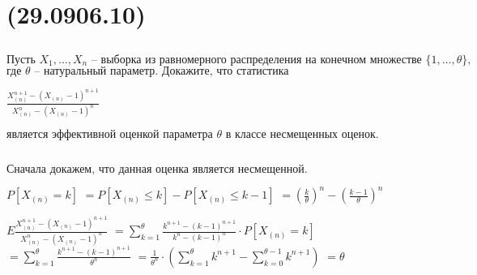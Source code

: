 \documentclass[13pt,a4paper]{scrartcl}
\def\suml{\sum\limits}
\def\prodl{\prod\limits}
\begin{document}
\def\th{\theta}
\def\prodl{\prod\limits}
\def\dd#1#2{\frac{\partial{#1}}{\partial{#2}}}
\def\maxl{\max\limits}

\section*{\allowbreak {}\allowbreak (29.09\text{ -- }06.10)}

\subsection*{\allowbreak }

\def\Xn{X_{(n)}}

\(\text{Пусть }\allowbreak X_1,..., X_n\text{ -- }\text{выборка }\allowbreak \text{из }\allowbreak \text{равномерного }\allowbreak \text{распределения }\allowbreak \text{на }\allowbreak \text{конечном }\allowbreak \text{множестве }\allowbreak \{ 1,..., \th \},\)
\(\text{где }\allowbreak \th\text{ -- }\text{натуральный }\allowbreak \text{параметр. }\allowbreak \text{Докажите, }\allowbreak \text{что }\allowbreak \text{статистика}\allowbreak \)

\(\frac{\Xn^{n + 1} - (\Xn - 1)^{n + 1} }{\Xn^n - (\Xn - 1)^n}\)
\medskip

\(\text{является }\allowbreak \text{эффективной }\allowbreak \text{оценкой }\allowbreak \text{параметра }\allowbreak \th\text{ в }\allowbreak \text{классе }\allowbreak \text{несмещенных }\allowbreak \text{оценок.}\allowbreak \)

\subsection*{\allowbreak }

\subsubsection*{\allowbreak }

\(\text{Сначала }\allowbreak \text{докажем, }\allowbreak \text{что }\allowbreak \text{данная }\allowbreak \text{оценка }\allowbreak \text{является }\allowbreak \text{несмещенной.}\allowbreak \)

\(P[\Xn = k]\)
\(= P[\Xn \le  k] - P[\Xn \le  k - 1]\)
\(= (\frac{k }{\th})^n - (\frac{k - 1 }{\th})^n\)

\(E \frac{\Xn^{n + 1} - (\Xn - 1)^{n + 1} }{\Xn^n - (\Xn - 1)^n}\)
\(= \suml_{k = 1}^{\th} \frac{k^{n + 1} - (k - 1)^{n + 1} }{k^n - (k - 1)^n}\cdot  P[\Xn = k]\)
\(= \suml_{k = 1}^{\th} \frac{k^{n + 1} - (k - 1)^{n + 1} }{\th^n}\)
\(= \frac{1 }{\th^n}\cdot  (\suml_{k = 1}^{\th} k^{n + 1} - \suml_{k = 0}^{\th-1} k^{n + 1})\)
\(= \th\)
\end{document}
